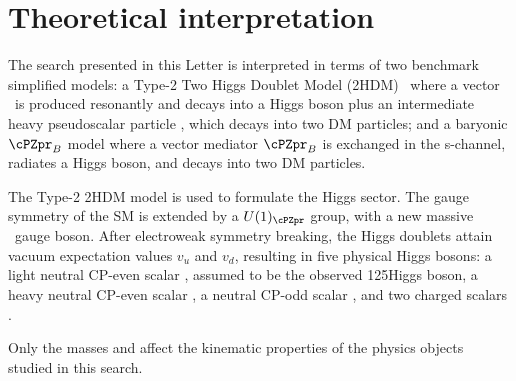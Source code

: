 \section{Theoretical interpretation \label{sec:model}}

The search presented in this Letter is interpreted in terms of two benchmark simplified models: a Type-2 Two Higgs Doublet Model (2HDM)~\cite{Lee:1973iz,Branco:2011iw} where a vector \cPZpr\ is produced resonantly and decays into a Higgs boson plus an intermediate heavy pseudoscalar particle \Az, which decays into two DM particles; and a baryonic $\cPZpr_{B}$ model where a vector mediator $\cPZpr_{B}$ is exchanged in the s-channel, radiates a Higgs boson, and decays into two DM particles.

The Type-2 2HDM model is used to formulate
the Higgs sector. The gauge symmetry of the SM is extended by a
$U(1)_{\cPZpr}$ group, with a new massive \cPZpr\ gauge boson.
After electroweak symmetry breaking, the Higgs doublets attain vacuum
expectation values $v_u$ and $v_d$,
resulting in five physical Higgs bosons:
a light neutral CP-even scalar \Ph, assumed to be the
observed 125\GeV Higgs boson, a heavy neutral CP-even scalar \PH,
a neutral CP-odd scalar \Az, and two charged scalars \Hpm.

Only the masses \maz and \mzp affect the kinematic
properties of the physics objects studied in this search.

